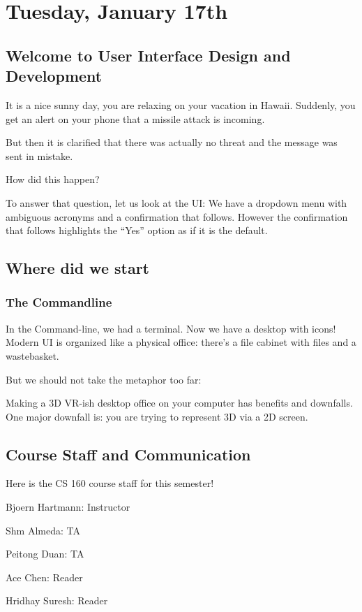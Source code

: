 \section{Tuesday, January 17th}
\subsection{Welcome to User Interface Design and Development}
It is a nice sunny day, you are relaxing on your vacation in Hawaii. Suddenly, you get an alert on your phone that a missile attack is incoming.

But then it is clarified that there was actually no threat and the message was sent in mistake.

How did this happen?

To answer that question, let us look at the UI: We have a dropdown menu with ambiguous acronyms and a confirmation that follows. However the confirmation that follows highlights the ``Yes'' option as if it is the default.

\subsection{Where did we start}
\subsubsection{The Commandline}
In the Command-line, we had a terminal. Now we have a desktop with icons! Modern UI is organized like a physical office: there's a file cabinet with files and a wastebasket.

\begin{important}
But we should not take the metaphor too far:

Making a 3D VR-ish desktop office on your computer has benefits and downfalls. One major downfall is: you are trying to represent 3D via a 2D screen.
\end{important}

\subsection{Course Staff and Communication}
Here is the CS 160 course staff for this semester!

Bjoern Hartmann: Instructor

Shm Almeda: TA

Peitong Duan: TA

Ace Chen: Reader

Hridhay Suresh: Reader

